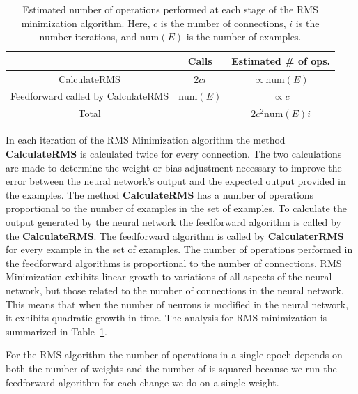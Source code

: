 \documentclass[11pt]{article}
\begin{document}
\begin{table}
	\begin{center}
		\begin{tabular}{ccc}
		\hline
		 & Calls & Estimated \# of ops.\\
		\hline
		CalculateRMS & $2ci$ & $\propto \mbox{num}(E)$\\
		Feedforward called by CalculateRMS & $\mbox{num}(E)$ & $\propto c$\\
		\hline
		Total &  & $2c^2\mbox{num}(E)i$\\
		\hline
		\end{tabular}	
	\end{center}
	\caption{Estimated number of operations performed at each stage of the RMS minimization algorithm. Here, $c$ is the number of connections, $i$ is the number iterations, and $\mbox{num}(E)$ is the number of examples.}
	\label{tab:RMSminimization}
\end{table}

In each iteration of the RMS Minimization algorithm the method \textbf{CalculateRMS} is calculated twice for every connection. The two
calculations are made to determine the weight or bias adjustment necessary to improve the error between the neural network's output and
the expected output provided in the examples. The method \textbf{CalculateRMS} has a number of operations proportional to the number of
examples in the set of examples. To calculate the output generated by the neural network the feedforward algorithm is called by the
\textbf{CalculateRMS}. The feedforward algorithm is called by \textbf{CalculaterRMS} for every example in the set of examples. The
number of operations performed in the feedforward algorithms is proportional to the number of connections. RMS Minimization exhibits
linear growth to variations of all aspects of the neural network, but those related to the number of connections in the neural network.
This means that when the number of neurons is modified in the neural network, it exhibits quadratic growth in time. The analysis for RMS
minimization is summarized in Table~\ref{tab:RMSminimization}.

For the RMS algorithm the number of operations in a single epoch depends on both the number of weights and the number of is squared
because we run the feedforward algorithm for each change we do on a single weight.
\end{document}
